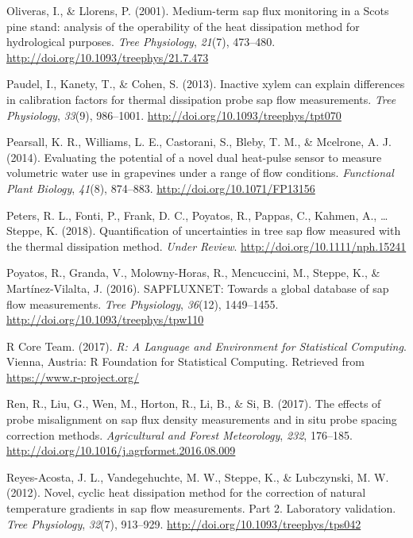 \documentclass[11pt,twoside]{reedthesis}
\begin{document}
\hypertarget{ref-Oliveras2001}{}
Oliveras, I., \& Llorens, P. (2001). Medium-term sap flux monitoring in
a Scots pine stand: analysis of the operability of the heat dissipation
method for hydrological purposes. \emph{Tree Physiology}, \emph{21}(7),
473--480. \url{http://doi.org/10.1093/treephys/21.7.473}

\hypertarget{ref-Paudel2013}{}
Paudel, I., Kanety, T., \& Cohen, S. (2013). Inactive xylem can explain
differences in calibration factors for thermal dissipation probe sap
flow measurements. \emph{Tree Physiology}, \emph{33}(9), 986--1001.
\url{http://doi.org/10.1093/treephys/tpt070}

\hypertarget{ref-Pearsall2014}{}
Pearsall, K. R., Williams, L. E., Castorani, S., Bleby, T. M., \&
Mcelrone, A. J. (2014). Evaluating the potential of a novel dual
heat-pulse sensor to measure volumetric water use in grapevines under a
range of flow conditions. \emph{Functional Plant Biology}, \emph{41}(8),
874--883. \url{http://doi.org/10.1071/FP13156}

\hypertarget{ref-Peters2018}{}
Peters, R. L., Fonti, P., Frank, D. C., Poyatos, R., Pappas, C., Kahmen,
A., \ldots{} Steppe, K. (2018). Quantification of uncertainties in tree
sap flow measured with the thermal dissipation method. \emph{Under
Review}. \url{http://doi.org/10.1111/nph.15241}

\hypertarget{ref-Poyatos2016}{}
Poyatos, R., Granda, V., Molowny-Horas, R., Mencuccini, M., Steppe, K.,
\& Martínez-Vilalta, J. (2016). SAPFLUXNET: Towards a global database of
sap flow measurements. \emph{Tree Physiology}, \emph{36}(12),
1449--1455. \url{http://doi.org/10.1093/treephys/tpw110}

\hypertarget{ref-RCoreTeam2017}{}
R Core Team. (2017). \emph{R: A Language and Environment for Statistical
Computing}. Vienna, Austria: R Foundation for Statistical Computing.
Retrieved from \url{https://www.r-project.org/}

\hypertarget{ref-Ren2017}{}
Ren, R., Liu, G., Wen, M., Horton, R., Li, B., \& Si, B. (2017). The
effects of probe misalignment on sap flux density measurements and in
situ probe spacing correction methods. \emph{Agricultural and Forest
Meteorology}, \emph{232}, 176--185.
\url{http://doi.org/10.1016/j.agrformet.2016.08.009}

\hypertarget{ref-Reyes-Acosta2012}{}
Reyes-Acosta, J. L., Vandegehuchte, M. W., Steppe, K., \& Lubczynski, M.
W. (2012). Novel, cyclic heat dissipation method for the correction of
natural temperature gradients in sap flow measurements. Part 2.
Laboratory validation. \emph{Tree Physiology}, \emph{32}(7), 913--929.
\url{http://doi.org/10.1093/treephys/tps042}
\end{document}
